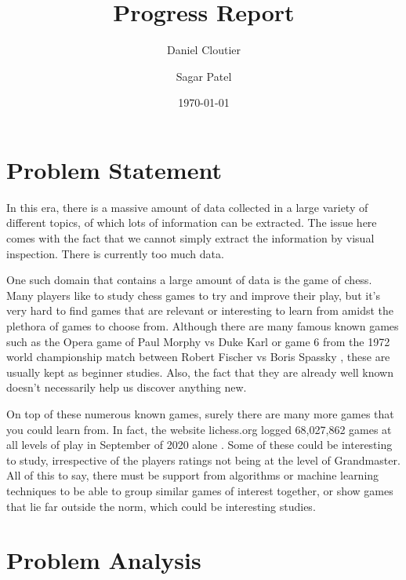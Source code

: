 \documentclass[12pt]{article}
\title{Progress Report}
\author{Daniel Cloutier \and Sagar Patel}
\date{\today}
\begin{document}
    \begin{singlespace}
        \maketitle 
    \end{singlespace}

    \section{Problem Statement}

    In this era, there is a massive amount of data collected in a large variety of different topics, of which lots of information can be extracted. The issue here comes with the fact that we cannot simply extract the information by visual inspection. There is currently too much data. 
    
    One such domain that contains a large amount of data is the game of chess. Many players like to study chess games to try and improve their play, but it's very hard to find games that are relevant or interesting to learn from amidst the plethora of games to choose from. Although there are many famous known games such as the Opera game of Paul Morphy vs Duke Karl or game 6 from the 1972 world championship match between Robert Fischer vs Boris Spassky \cite{chessgames}, these are usually kept as beginner studies. Also, the fact that they are already well known doesn't necessarily help us discover anything new. 
    
    On top of these numerous known games, surely there are many more games that you could learn from. In fact, the website lichess.org logged 68,027,862 games at all levels of play in September of 2020 alone \cite{lichessdb}. Some of these could be interesting to study, irrespective of the players ratings not being at the level of Grandmaster. All of this to say, there must be support from algorithms or machine learning techniques to be able to group similar games of interest together, or show games that lie far outside the norm, which could be interesting studies.

    \section{Problem Analysis}
\end{document}
